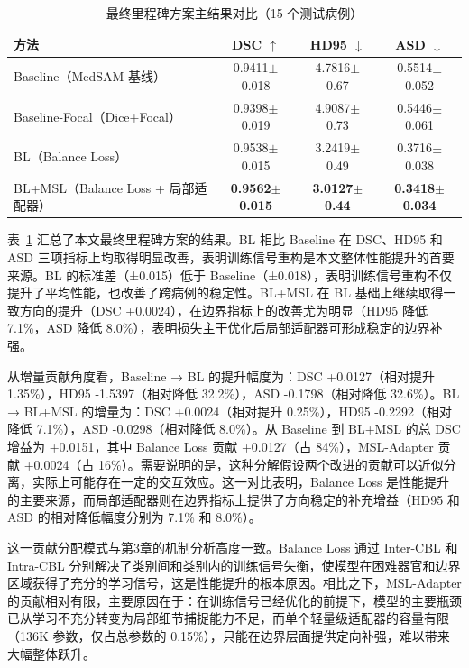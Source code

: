 \begin{table}[htbp]
  \centering
  \caption{最终里程碑方案主结果对比（15 个测试病例）}
  \label{tab:main_results}
  \begin{tabular}{lccc}
    \hline
    方法 & DSC $\uparrow$ & HD95 $\downarrow$ & ASD $\downarrow$ \\
    \hline
    Baseline（MedSAM 基线） & 0.9411$\pm$0.018 & 4.7816$\pm$0.67 & 0.5514$\pm$0.052 \\
    Baseline-Focal（Dice+Focal） & 0.9398$\pm$0.019 & 4.9087$\pm$0.73 & 0.5446$\pm$0.061 \\
    BL（Balance Loss） & 0.9538$\pm$0.015 & 3.2419$\pm$0.49 & 0.3716$\pm$0.038 \\
    BL+MSL（Balance Loss + 局部适配器） & \textbf{0.9562$\pm$0.015} & \textbf{3.0127$\pm$0.44} & \textbf{0.3418$\pm$0.034} \\
    \hline
  \end{tabular}
\end{table}

表~\ref{tab:main_results} 汇总了本文最终里程碑方案的结果。BL 相比 Baseline 在 DSC、HD95 和 ASD 三项指标上均取得明显改善，表明训练信号重构是本文整体性能提升的首要来源。BL 的标准差（±0.015）低于 Baseline（±0.018），表明训练信号重构不仅提升了平均性能，也改善了跨病例的稳定性。BL+MSL 在 BL 基础上继续取得一致方向的提升（DSC +0.0024），在边界指标上的改善尤为明显（HD95 降低 7.1\%，ASD 降低 8.0\%），表明损失主干优化后局部适配器可形成稳定的边界补强。

从增量贡献角度看，Baseline → BL 的提升幅度为：DSC +0.0127（相对提升 1.35\%），HD95 -1.5397（相对降低 32.2\%），ASD -0.1798（相对降低 32.6\%）。BL → BL+MSL 的增量为：DSC +0.0024（相对提升 0.25\%），HD95 -0.2292（相对降低 7.1\%），ASD -0.0298（相对降低 8.0\%）。从 Baseline 到 BL+MSL 的总 DSC 增益为 +0.0151，其中 Balance Loss 贡献 +0.0127（占 84\%），MSL-Adapter 贡献 +0.0024（占 16\%）。需要说明的是，这种分解假设两个改进的贡献可以近似分离，实际上可能存在一定的交互效应。这一对比表明，Balance Loss 是性能提升的主要来源，而局部适配器则在边界指标上提供了方向稳定的补充增益（HD95 和 ASD 的相对降低幅度分别为 7.1\% 和 8.0\%）。

这一贡献分配模式与第3章的机制分析高度一致。Balance Loss 通过 Inter-CBL 和 Intra-CBL 分别解决了类别间和类别内的训练信号失衡，使模型在困难器官和边界区域获得了充分的学习信号，这是性能提升的根本原因。相比之下，MSL-Adapter 的贡献相对有限，主要原因在于：在训练信号已经优化的前提下，模型的主要瓶颈已从学习不充分转变为局部细节捕捉能力不足，而单个轻量级适配器的容量有限（136K 参数，仅占总参数的 0.15\%），只能在边界层面提供定向补强，难以带来大幅整体跃升。

